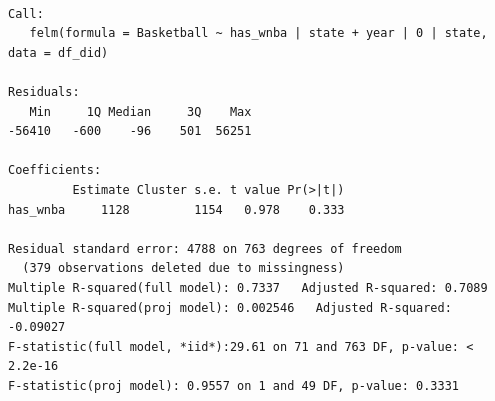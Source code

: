 \documentclass[
  letterpaper,
  DIV=11,
  numbers=noendperiod]{scrartcl}
\begin{document}
\begin{verbatim}

Call:
   felm(formula = Basketball ~ has_wnba | state + year | 0 | state,      data = df_did) 

Residuals:
   Min     1Q Median     3Q    Max 
-56410   -600    -96    501  56251 

Coefficients:
         Estimate Cluster s.e. t value Pr(>|t|)
has_wnba     1128         1154   0.978    0.333

Residual standard error: 4788 on 763 degrees of freedom
  (379 observations deleted due to missingness)
Multiple R-squared(full model): 0.7337   Adjusted R-squared: 0.7089 
Multiple R-squared(proj model): 0.002546   Adjusted R-squared: -0.09027 
F-statistic(full model, *iid*):29.61 on 71 and 763 DF, p-value: < 2.2e-16 
F-statistic(proj model): 0.9557 on 1 and 49 DF, p-value: 0.3331 
\end{verbatim}
\end{document}
